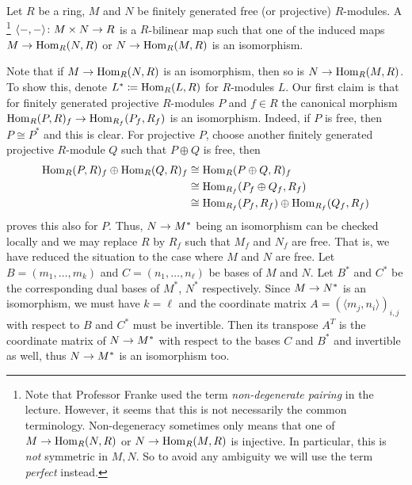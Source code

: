 \documentclass[a4paper,parskip=half,numbers=enddot, DIV=12]{scrreprt}
\begin{document}
\begin{defi}
	Let $R$ be a ring, $M$ and $N$ be finitely generated free (or projective) $R$-modules. A \footnote{Note that Professor Franke used the term \emph{non-degenerate pairing} in the lecture. However, it seems that this is not necessarily the common terminology. Non-degeneracy sometimes only means that one of $M\morphism \Hom_R(N,R)$ or $N\morphism\Hom_R(M,R)$ is injective. In particular, this is \emph{not} symmetric in $M,N$. So to avoid any ambiguity we will use the term \emph{perfect} instead.} $\langle -,-\rangle\colon M\times N\morphism R$ is a $R$-bilinear map such that one of the induced maps $M\morphism\Hom_R(N,R)$ or $N\morphism \Hom_R(M,R)$ is an isomorphism.
\end{defi}
\begin{rem*}
	Note that if $M\morphism\Hom_R(N,R)$ is an isomorphism, then so is $N\morphism\Hom_R(M,R)$. To show this, denote $L^*\coloneqq \operatorname{Hom}_R(L,R)$ for $R$-modules $L$. Our first claim is that for finitely generated projective $R$-modules $P$ and $f\in R$ the canonical morphism $\Hom_R(P,R)_f\morphism \Hom_{R_f}(P_f,R_f)$ is an isomorphism. Indeed, if $P$ is free, then $P\cong P^*$ and this is clear. For projective $P$, choose another finitely generated projective $R$-module $Q$ such that $P\oplus Q$ is free, then
	\begin{align*}
	\operatorname{Hom}_R(P,R)_f\oplus\operatorname{Hom}_R(Q,R)_f&\cong\operatorname{Hom}_R(P\oplus Q,R)_f\\
	&\cong\operatorname{Hom}_{R_f}(P_f\oplus Q_f,R_f)\\
	&\cong \operatorname{Hom}_{R_f}(P_f,R_f)\oplus \operatorname{Hom}_{R_f}(Q_f,R_f)
	\end{align*}
	proves this also for $P$. Thus, $N\morphism M^*$ being an isomorphism can be checked locally and we may replace $R$ by $R_f$ such that $M_f$ and $N_f$ are free. That is, we have reduced the situation to the case where $M$ and $N$ are free. Let $B=(m_1,\ldots,m_k)$ and $C=(n_1,\ldots,n_\ell)$ be bases of $M$ and $N$. Let $B^*$ and $C^*$ be the corresponding dual bases of $M^*$, $N^*$ respectively. Since $M\morphism N^*$ is an isomorphism, we must have $k=\ell$ and the coordinate matrix $A=(\langle m_j,n_i\rangle)_{i,j}$ with respect to $B$ and $C^*$ must be invertible. Then its transpose $A^T$ is the coordinate matrix of $N\morphism M^*$ with respect to the bases $C$ and $B^*$ and invertible as well, thus $N\morphism M^*$ is an isomorphism too.
\end{rem*}
\end{document}
